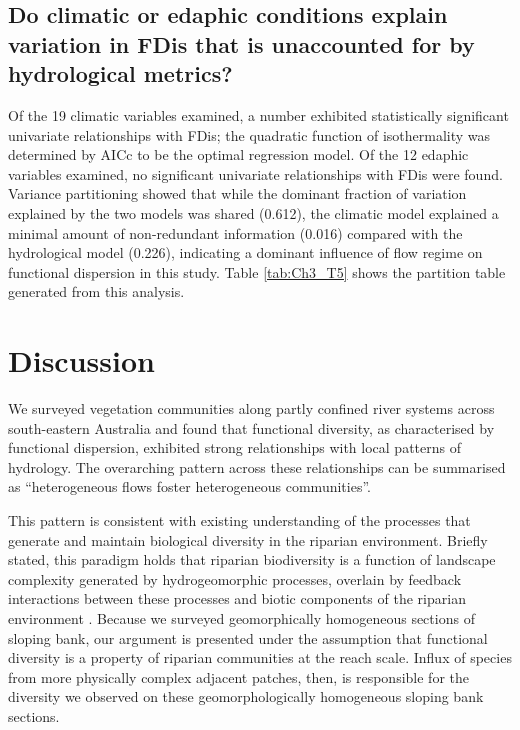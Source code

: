 \documentclass[12pt,a4paper]{memoir}
\begin{document}
\subsection{Do climatic or edaphic conditions explain variation in FDis that is unaccounted for by hydrological metrics?}
Of the 19 climatic variables examined, a number exhibited statistically significant univariate relationships with FDis; the quadratic function of isothermality was determined by AICc to be the optimal regression model. Of the 12 edaphic variables examined, no significant univariate relationships with FDis were found.  Variance partitioning showed that while the dominant fraction of variation explained by the two models was shared (0.612), the climatic model explained a minimal amount of non-redundant information (0.016) compared with the hydrological model (0.226), indicating a dominant influence of flow regime on functional dispersion in this study. Table \ref{tab:Ch3_T5} shows the partition table generated from this analysis.



\section{Discussion}
We surveyed vegetation communities along partly confined river systems across south-eastern Australia and found that functional diversity, as characterised by functional dispersion, exhibited strong relationships with local patterns of hydrology. The overarching pattern across these relationships can be summarised as “heterogeneous flows foster heterogeneous communities”.

This pattern is consistent with existing understanding of the processes that generate and maintain biological diversity in the riparian environment. Briefly stated, this paradigm holds that riparian biodiversity is a function of landscape complexity generated by hydrogeomorphic processes, overlain by feedback interactions between these processes and biotic components of the riparian environment \citep{Tabacchi1998, Palmer1997, Corenblit2007, Bornette2008}. Because we surveyed geomorphically homogeneous sections of sloping bank, our argument is presented under the assumption that functional diversity is a property of riparian communities at the reach scale. Influx of species from more physically complex adjacent patches, then, is responsible for the diversity we observed on these geomorphologically homogeneous sloping bank sections.
\end{document}
